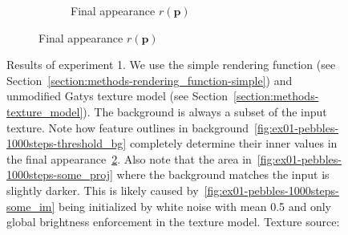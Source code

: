 \begin{figure}[]
\begin{subfigure}{\textwidth}
\begin{subfigure}{0.24\textwidth}
            \caption{Final appearance \(r(\bm{p})\)}
            \label{fig:ex01-pebbles-1000steps-threshold_proj}
        \end{subfigure}
    \end{subfigure}
    \caption{Results of experiment 1. We use the simple rendering function (see Section~\ref{section:methods-rendering_function-simple}) and unmodified Gatys texture model (see Section~\ref{section:methods-texture_model}). The background is always a subset of the input texture. Note how feature outlines in background~\ref{fig:ex01-pebbles-1000steps-threshold_bg} completely determine their inner values in the final appearance~\ref{fig:ex01-pebbles-1000steps-threshold_proj}. Also note that the area in~\ref{fig:ex01-pebbles-1000steps-some_proj} where the background matches the input is slightly darker. This is likely caused by~\ref{fig:ex01-pebbles-1000steps-some_im} being initialized by white noise with mean 0.5 and only global brightness enforcement in the texture model. Texture source: \citet{Gatys2015}}
    \label{fig:ex01-pebbles-1000steps}
\end{figure}

